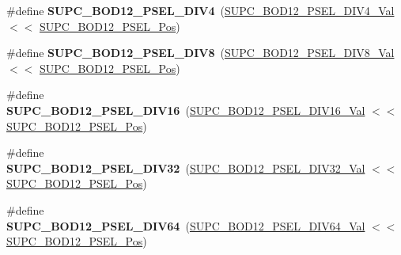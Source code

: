 \begin{DoxyCompactItemize}
\item 
\hypertarget{group___s_a_m_l21___s_u_p_c_ga78cda970289571ac4d1f1d6e76917000}{}\#define {\bfseries S\+U\+P\+C\+\_\+\+B\+O\+D12\+\_\+\+P\+S\+E\+L\+\_\+\+D\+I\+V4}~(\hyperlink{group___s_a_m_l21___s_u_p_c_ga31a86999e9c11882c01b45e0692dc897}{S\+U\+P\+C\+\_\+\+B\+O\+D12\+\_\+\+P\+S\+E\+L\+\_\+\+D\+I\+V4\+\_\+\+Val}      $<$$<$ \hyperlink{group___s_a_m_l21___s_u_p_c_ga43d50cdce3fb9ed37bfc9007dccac0d2}{S\+U\+P\+C\+\_\+\+B\+O\+D12\+\_\+\+P\+S\+E\+L\+\_\+\+Pos})\label{group___s_a_m_l21___s_u_p_c_ga78cda970289571ac4d1f1d6e76917000}

\item 
\hypertarget{group___s_a_m_l21___s_u_p_c_ga88c755da9460fd7601ed5ee253de8539}{}\#define {\bfseries S\+U\+P\+C\+\_\+\+B\+O\+D12\+\_\+\+P\+S\+E\+L\+\_\+\+D\+I\+V8}~(\hyperlink{group___s_a_m_l21___s_u_p_c_gaa5d5f4d26bee994b999d908ba80675d7}{S\+U\+P\+C\+\_\+\+B\+O\+D12\+\_\+\+P\+S\+E\+L\+\_\+\+D\+I\+V8\+\_\+\+Val}      $<$$<$ \hyperlink{group___s_a_m_l21___s_u_p_c_ga43d50cdce3fb9ed37bfc9007dccac0d2}{S\+U\+P\+C\+\_\+\+B\+O\+D12\+\_\+\+P\+S\+E\+L\+\_\+\+Pos})\label{group___s_a_m_l21___s_u_p_c_ga88c755da9460fd7601ed5ee253de8539}

\item 
\hypertarget{group___s_a_m_l21___s_u_p_c_gac66a179fb6396d111cb14684b5334611}{}\#define {\bfseries S\+U\+P\+C\+\_\+\+B\+O\+D12\+\_\+\+P\+S\+E\+L\+\_\+\+D\+I\+V16}~(\hyperlink{group___s_a_m_l21___s_u_p_c_ga0cc0b86ee2a7ef69953aa08d7160c381}{S\+U\+P\+C\+\_\+\+B\+O\+D12\+\_\+\+P\+S\+E\+L\+\_\+\+D\+I\+V16\+\_\+\+Val}     $<$$<$ \hyperlink{group___s_a_m_l21___s_u_p_c_ga43d50cdce3fb9ed37bfc9007dccac0d2}{S\+U\+P\+C\+\_\+\+B\+O\+D12\+\_\+\+P\+S\+E\+L\+\_\+\+Pos})\label{group___s_a_m_l21___s_u_p_c_gac66a179fb6396d111cb14684b5334611}

\item 
\hypertarget{group___s_a_m_l21___s_u_p_c_gae5dd8ff7230077caac88492144710d56}{}\#define {\bfseries S\+U\+P\+C\+\_\+\+B\+O\+D12\+\_\+\+P\+S\+E\+L\+\_\+\+D\+I\+V32}~(\hyperlink{group___s_a_m_l21___s_u_p_c_ga0e1d6f1e15a1a72a8410f137af2b3bfe}{S\+U\+P\+C\+\_\+\+B\+O\+D12\+\_\+\+P\+S\+E\+L\+\_\+\+D\+I\+V32\+\_\+\+Val}     $<$$<$ \hyperlink{group___s_a_m_l21___s_u_p_c_ga43d50cdce3fb9ed37bfc9007dccac0d2}{S\+U\+P\+C\+\_\+\+B\+O\+D12\+\_\+\+P\+S\+E\+L\+\_\+\+Pos})\label{group___s_a_m_l21___s_u_p_c_gae5dd8ff7230077caac88492144710d56}

\item 
\hypertarget{group___s_a_m_l21___s_u_p_c_ga9aaf5833f80bb18d727670a33603b691}{}\#define {\bfseries S\+U\+P\+C\+\_\+\+B\+O\+D12\+\_\+\+P\+S\+E\+L\+\_\+\+D\+I\+V64}~(\hyperlink{group___s_a_m_l21___s_u_p_c_gab257b93379a8513e52704da200df7d37}{S\+U\+P\+C\+\_\+\+B\+O\+D12\+\_\+\+P\+S\+E\+L\+\_\+\+D\+I\+V64\+\_\+\+Val}     $<$$<$ \hyperlink{group___s_a_m_l21___s_u_p_c_ga43d50cdce3fb9ed37bfc9007dccac0d2}{S\+U\+P\+C\+\_\+\+B\+O\+D12\+\_\+\+P\+S\+E\+L\+\_\+\+Pos})\label{group___s_a_m_l21___s_u_p_c_ga9aaf5833f80bb18d727670a33603b691}


\end{DoxyCompactItemize}
